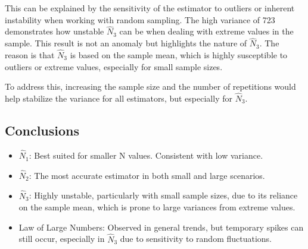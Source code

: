 \documentclass{report}
\begin{document}
This can be explained by the sensitivity of the estimator to outliers or inherent instability when working with random sampling. The high variance of 723 demonstrates how unstable $\hat{N}_3$ can be when dealing with extreme values in the sample. This result is not an anomaly but highlights the nature of $\hat{N}_3$. The reason is that $\hat{N}_3$ is based on the sample mean, which is highly susceptible to outliers or extreme values, especially for small sample sizes.

To address this, increasing the sample size and the number of repetitions would help stabilize the variance for all estimators, but especially for $\hat{N}_3$.


\subsection{Conclusions}

\begin{itemize}
  \item $\hat{N}_1$: Best suited for smaller N values. Consistent with low variance.
  \item $\hat{N}_2$: The most accurate estimator in both small and large scenarios.
  \item $\hat{N}_3$: Highly unstable, particularly with small sample sizes, due to its reliance on the sample mean, which is prone to large variances from extreme values.
  \item Law of Large Numbers: Observed in general trends, but temporary spikes can still occur, especially in $\hat{N}_3$ due to sensitivity to random fluctuations.
\end{itemize}
\end{document}
